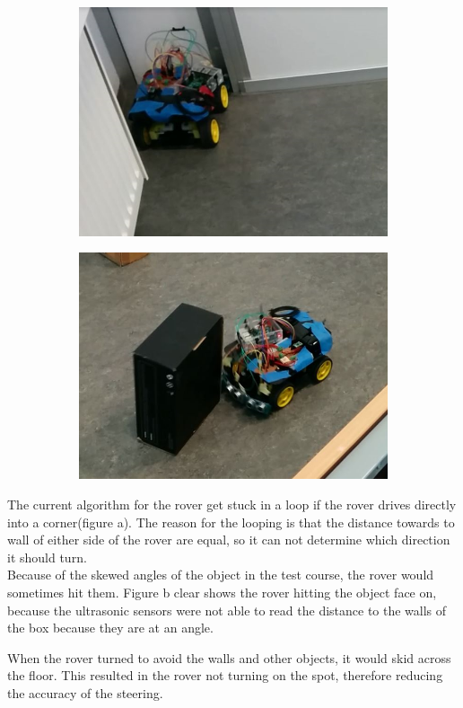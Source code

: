 \clearpage
\begin{figure}[H]
	\centering
	\begin{subfigure}[H]{0.4\textwidth}
		\includegraphics[width=\textwidth]{images/test-stuckincorner.jpg}
		\subcaption{}
	\end{subfigure}%
	\quad
	\begin{subfigure}[H]{0.4\textwidth}
		\includegraphics[width=\textwidth]{images/test-badmeasuringangle.jpg}
		\subcaption{}
	\end{subfigure}
\end{figure}

The current algorithm for the rover get stuck in a loop if the rover drives directly into a corner(figure a). The reason for the looping is that the distance towards to wall of either side of the rover are equal, so it can not determine which direction it should turn.\\
Because of the skewed angles of the object in the test course, the rover would sometimes hit them. Figure b clear shows the rover hitting the object face on, because the ultrasonic sensors were not able to read the distance to the walls of the box because they are at an angle.

When the rover turned to avoid the walls and other objects, it would skid across the floor. This resulted in the rover not turning on the spot, therefore reducing the accuracy of the steering.